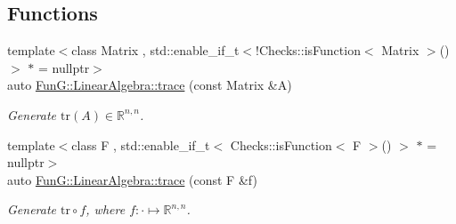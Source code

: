 \subsection*{Functions}
\begin{DoxyCompactItemize}
\item 
{\footnotesize template$<$class Matrix , std\+::enable\+\_\+if\+\_\+t$<$!\+Checks\+::is\+Function$<$ Matrix $>$()$>$ $\ast$  = nullptr$>$ }\\auto \hyperlink{group__LinearAlgebraGroup_ga4d73eb4d46dd9196a31e2d6d557d509e}{Fun\+G\+::\+Linear\+Algebra\+::trace} (const Matrix \&A)
\begin{DoxyCompactList}\small\item\em Generate $\mathrm{tr}(A)\in\mathbb{R}^{n,n}$. \end{DoxyCompactList}\item 
{\footnotesize template$<$class F , std\+::enable\+\_\+if\+\_\+t$<$ Checks\+::is\+Function$<$ F $>$() $>$ $\ast$  = nullptr$>$ }\\auto \hyperlink{group__LinearAlgebraGroup_ga950717870525c43be79245413717673c}{Fun\+G\+::\+Linear\+Algebra\+::trace} (const F \&f)
\begin{DoxyCompactList}\small\item\em Generate $\mathrm{tr}\circ f$, where $f:\cdot\mapsto\mathbb{R}^{n,n} $. \end{DoxyCompactList}\end{DoxyCompactItemize}
